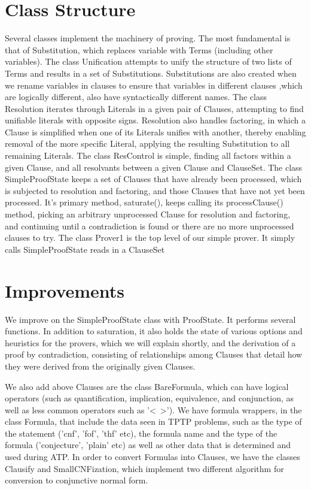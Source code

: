 \documentclass{llncs}
\begin{document}
\section{Class Structure}

Several classes implement the machinery of proving.  The most fundamental is that of Substitution,
which replaces variable with Terms (including other variables).   The class Unification attempts to
unify the structure of two lists of Terms and results in a set of Substitutions.  Substitutions are
also created when we rename variables in clauses to ensure that variables in different clauses
,which are logically different, also have syntactically different names.  The class Resolution
iterates through Literals in a given pair of Clauses, attempting to find unifiable literals with
opposite signs.  Resolution also handles factoring, in which a Clause is simplified when one of
its Literals unifies with another, thereby enabling removal of the more specific Literal, applying
the resulting Substitution to all remaining Literals.  The class ResControl is simple, finding
all factors within a given Clause, and all resolvants between a given Clause and ClauseSet.  The class
SimpleProofState keeps a set of Clauses that
have already been processed, which is subjected to resolution and factoring, and those Clauses that
have not yet been processed.  It's primary method, saturate(), keeps calling its processClause()
method, picking an arbitrary unprocessed Clause for resolution and factoring, and continuing until
a contradiction is found or there are no more unprocessed clauses to try.  The class Prover1 is
the top level of our simple prover.  It simply calls SimpleProofState reads in a ClauseSet

\section{Improvements}

We improve on the SimpleProofState class with ProofState. It performs several functions.  In addition
to saturation, it also holds the state of various options and heuristics for
the provers, which we will explain shortly, and the derivation of a proof by contradiction,
consisting of relationships among Clauses that detail how they were derived from the originally
given Clauses.

We also add above Clauses are the class BareFormula, which can have logical operators (such as quantification, implication, equivalence,
and conjunction, as well as less common operators such as '<~>').  We have formula wrappers, in the class Formula,
that include the data seen in TPTP problems, such as the type of the statement ('cnf', 'fof', 'thf' etc),
the formula name and the type of the formula ('conjecture', 'plain' etc) as well as other data
that is determined and used during ATP. In order to convert Formulas
into Clauses, we have the classes Clausify and SmallCNFization, which implement two different algorithm
for conversion to conjunctive normal form.
\end{document}
